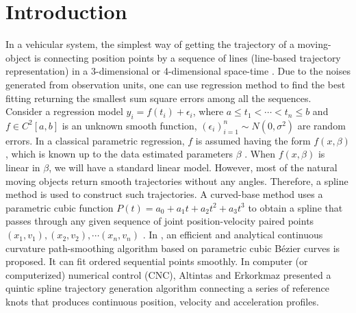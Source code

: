 \section{Introduction}

In a vehicular system, the simplest way of getting the trajectory of a moving-object is connecting position points by a sequence of lines (line-based trajectory representation) in a 3-dimensional or 4-dimensional space-time \cite{agarwal2003indexing}. Due to the noises generated from observation units, one can use regression method to find the best fitting returning the smallest sum square errors among all the sequences. Consider a regression model $y_i=f(t_i)+\epsilon_i$, where $a \leq t_1 < \cdots < t_n \leq b$ and $f \in \mathit{C}^2[a,b]$ is an unknown smooth function, $(\epsilon_i)_{i=1}^n \sim N(0,\sigma^2)$ are random errors. In a classical parametric regression, $f$ is assumed having the form $f(x,\beta)$, which is known up to the data estimated parameters $\beta$ \cite{kim2004smoothing}. When $f(x,\beta)$ is linear in $\beta$, we will have a standard linear model. However, most of the natural moving objects return smooth trajectories without any angles. Therefore, a spline method is used to construct such trajectories. A curved-base method uses a parametric cubic function $P(t)=a_0+a_1t+a_2t^2+a_3t^3$ to obtain a spline that passes through any given sequence of joint position-velocity paired points $(x_1, v_1), (x_2, v_2), \cdots (x_n,v_n)$ \cite{yu2004curve}.  In \cite{yang2010analytical}, an efficient and analytical continuous curvature path-smoothing algorithm based on parametric cubic B\'{e}zier curves is proposed. It can fit ordered sequential points smoothly. In computer (or computerized) numerical control (CNC), Altintas and Erkorkmaz \cite{erkorkmaz2001high} presented a quintic spline trajectory generation algorithm connecting a series of reference knots that produces continuous position, velocity and acceleration profiles.

